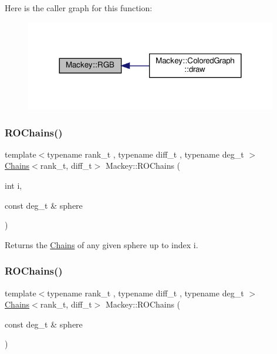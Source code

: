Here is the caller graph for this function\+:\nopagebreak
\begin{figure}[H]
\begin{center}
\leavevmode
\includegraphics[width=312pt]{namespaceMackey_a12645e850e7965ee23d47e00ac7affdf_icgraph}
\end{center}
\end{figure}
\mbox{\label{namespaceMackey_a08fd3743ffb625fceca454da757dfa5d}} 
\subsubsection{\texorpdfstring{R\+O\+Chains()}{ROChains()}\hspace{0.1cm}{\footnotesize\ttfamily [1/2]}}
{\footnotesize\ttfamily template$<$typename rank\+\_\+t , typename diff\+\_\+t , typename deg\+\_\+t $>$ \\
\hyperlink{classMackey_1_1Chains}{Chains}$<$rank\+\_\+t, diff\+\_\+t$>$ Mackey\+::\+R\+O\+Chains (\begin{DoxyParamCaption}\item[{int}]{i,  }\item[{const deg\+\_\+t \&}]{sphere }\end{DoxyParamCaption})}



Returns the \hyperlink{classMackey_1_1Chains}{Chains} of any given sphere up to index i. 

\mbox{\label{namespaceMackey_abd3c2e12c91baa573c6dbaa37eeb0518}} 
\subsubsection{\texorpdfstring{R\+O\+Chains()}{ROChains()}\hspace{0.1cm}{\footnotesize\ttfamily [2/2]}}
{\footnotesize\ttfamily template$<$typename rank\+\_\+t , typename diff\+\_\+t , typename deg\+\_\+t $>$ \\
\hyperlink{classMackey_1_1Chains}{Chains}$<$rank\+\_\+t, diff\+\_\+t$>$ Mackey\+::\+R\+O\+Chains (\begin{DoxyParamCaption}\item[{const deg\+\_\+t \&}]{sphere }\end{DoxyParamCaption})}




